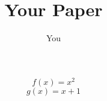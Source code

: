 \documentclass{article}
\title{Your Paper}
\author{You}
\begin{document}
\[f(x) = x^2\]
\[g(x) = x + 1\]
\end{document}
